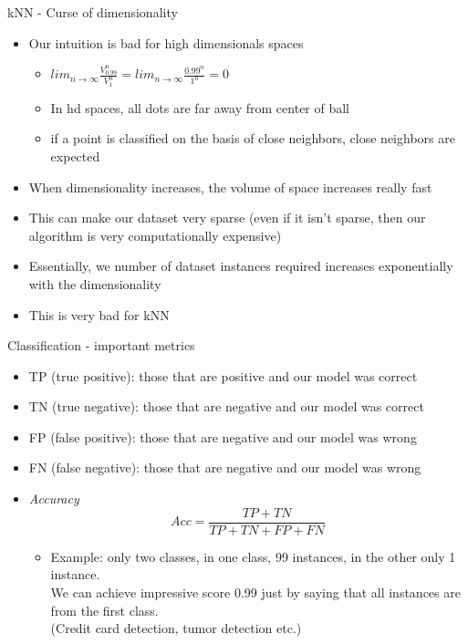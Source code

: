 \documentclass[aspectratio=169]{beamer}
\begin{document}
\begin{frame}{kNN - Curse of dimensionality}
    \begin{itemize}
        \item Our intuition is bad for high dimensionals spaces
        \begin{itemize}
            \item $lim_{n\rightarrow{\infty}} \frac{V_{0.99}^n}{V_1^n} = lim_{n\rightarrow{\infty}} \frac{0.99^n}{1^n} = 0$
            \item In hd spaces, all dots are far away from center of ball
            \item if a point is classified on the basis of close neighbors, close neighbors are expected
        \end{itemize}
        \item When dimensionality increases, the volume of space increases really fast
        \item This can make our dataset very sparse (even if it isn't sparse, then our algorithm is very computationally expensive)
        \item Essentially, we number of dataset instances required increases exponentially with the dimensionality
        \item This is very bad for kNN
    \end{itemize}
\end{frame}
\begin{frame}{Classification - important metrics}
    \begin{itemize}
        \item TP (true positive): those that are positive and our model was correct
        \item TN (true negative): those that are negative and our model was correct
        \item FP (false positive): those that are negative and our model was wrong
        \item FN (false negative): those that are negative and our model was wrong
        \item \textit{Accuracy}
            $$ Acc = \frac{TP + TN}{TP + TN + FP + FN} $$
        \begin{itemize}
            \item Example: only two classes, in one class, 99 instances, in the other only 1 instance. \\
            We can achieve impressive score 0.99 just by saying that all instances are from the first class. \\
            (Credit card detection, tumor detection etc.)
        \end{itemize}
    \end{itemize}
\end{frame}
\end{document}
